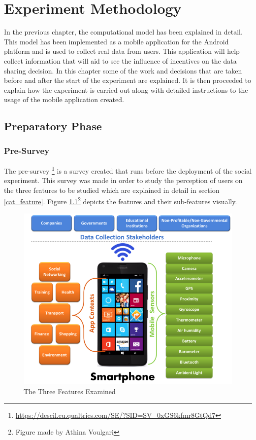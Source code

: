 \chapter{Experiment Methodology} \label{exp}

In the previous chapter, the computational model has been explained in detail. This model has been implemented as a mobile application for the Android platform and is used to collect real data from users. This application will help collect information that will aid to see the influence of incentives on the data sharing decision. In this chapter some of the work and decisions that are taken before and after the start of the experiment are explained. It is then proceeded to explain how the experiment is carried out along with detailed instructions to the usage of the mobile application created. 

\section{Preparatory Phase}

\subsection{Pre-Survey}

The pre-survey \footnote{\url{https://descil.eu.qualtrics.com/SE/?SID=SV_0xGS6kfmr8GtQd7}} is a survey created that runs before the deployment of the social experiment. This
survey was made in order to study the perception of users on the three features to be studied which are explained in detail in section \ref{cat_feature}. Figure \ref{fig:all_features}\footnote{Figure made by Athina Voulgari} depicts the features and their sub-features visually.

\begin{figure}[ht!]
\centering
\includegraphics[width=\textwidth,keepaspectratio]{./images/all_features}
\caption{The Three Features Examined}
\label{fig:all_features}
\end{figure}

